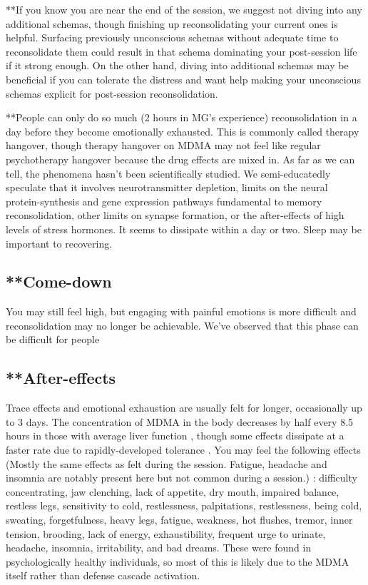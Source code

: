 \documentclass[12pt,letterpaper]{book}
\begin{document}
**If you know you are near the end of the session, we suggest not diving into any additional schemas, though finishing up reconsolidating your current ones is helpful. Surfacing previously unconscious schemas without adequate time to reconsolidate them could result in that schema dominating your post-session life if it strong enough. On the other hand, diving into additional schemas may be beneficial if you can tolerate the distress and want help making your unconscious schemas explicit for post-session reconsolidation.

\label{def:hangover}
**People can only do so much (2 hours in MG's experience) reconsolidation in a day before they become emotionally exhausted. This is commonly called therapy hangover, though therapy hangover on MDMA may not feel like regular psychotherapy hangover because the drug effects are mixed in. As far as we can tell, the phenomena hasn't been scientifically studied. We semi-educatedly speculate that it involves neurotransmitter depletion, limits on the neural protein-synthesis and gene expression pathways fundamental to memory reconsolidation, other limits on synapse formation, or the after-effects of high levels of stress hormones. It seems to dissipate within a day or two. Sleep may be important to recovering.

\subsection*{**Come-down} You may still feel high, but engaging with painful emotions is more difficult and reconsolidation may no longer be achievable. We've observed that this phase can be difficult for people

\subsection*{**After-effects}
\label{after}
Trace effects and emotional exhaustion are usually felt for longer, occasionally up to 3 days. The concentration of MDMA in the body decreases by half every 8.5 hours in those with average liver function \cite{torrePharmacology}, though some effects dissipate at a faster rate due to rapidly-developed tolerance \cite{farreTolerance,parrottTolerance}. You may feel the following effects (Mostly the same effects as felt during the session. Fatigue, headache and insomnia are notably present here but not common during a session.) \cite{liechtiGender}: difficulty concentrating, jaw clenching, lack of appetite, dry mouth, impaired balance, restless legs, sensitivity to cold, restlessness, palpitations, restlessness, being cold, sweating, forgetfulness, heavy legs, fatigue, weakness, hot flushes, tremor, inner tension, brooding, lack of energy, exhaustibility, frequent urge to urinate, headache, insomnia, irritability, and bad dreams. These were found in psychologically healthy individuals, so most of this is likely due to the MDMA itself rather than defense cascade activation.
\end{document}

